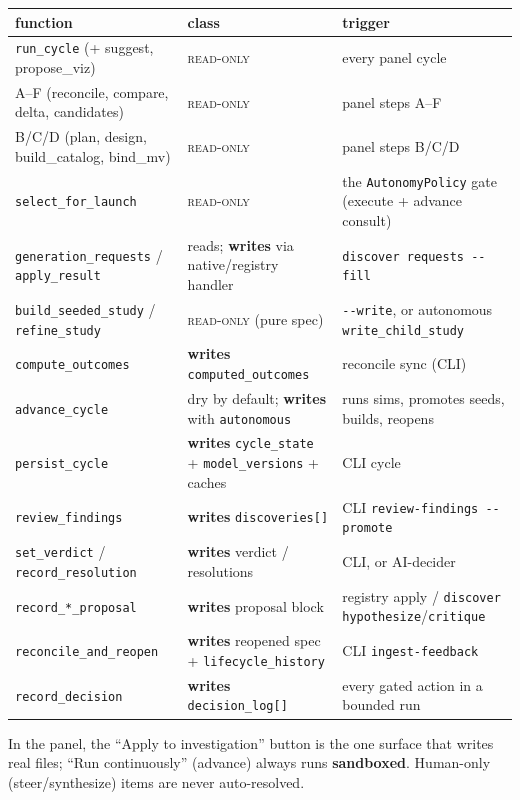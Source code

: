 \documentclass[11pt]{article}
\newcommand{\code}[1]{\texttt{\small #1}}
\begin{document}
\begin{center}\small
\begin{tabularx}{\textwidth}{@{}llY@{}}
\toprule
\textbf{function} & \textbf{class} & \textbf{trigger}\\
\midrule
\code{run\_cycle} (+ suggest, propose\_viz) & \textsc{read-only} & every panel cycle\\
A--F (reconcile, compare, delta, candidates) & \textsc{read-only} & panel steps A--F\\
B/C/D (plan, design, build\_catalog, bind\_mv) & \textsc{read-only} & panel steps B/C/D\\
\code{select\_for\_launch} & \textsc{read-only} & the \code{AutonomyPolicy} gate (execute + advance consult)\\
\code{generation\_requests} / \code{apply\_result} & reads; \textbf{writes} via native/registry handler & \code{discover requests -{}-fill}\\
\code{build\_seeded\_study} / \code{refine\_study} & \textsc{read-only} (pure spec) & \code{-{}-write}, or autonomous \code{write\_child\_study}\\
\code{compute\_outcomes} & \textbf{writes} \code{computed\_outcomes} & reconcile sync (CLI)\\
\code{advance\_cycle} & dry by default; \textbf{writes} with \code{autonomous} & runs sims, promotes seeds, builds, reopens\\
\code{persist\_cycle} & \textbf{writes} \code{cycle\_state} + \code{model\_versions} + caches & CLI cycle\\
\code{review\_findings} & \textbf{writes} \code{discoveries[]} & CLI \code{review-findings -{}-promote}\\
\code{set\_verdict} / \code{record\_resolution} & \textbf{writes} verdict / resolutions & CLI, or AI-decider\\
\code{record\_*\_proposal} & \textbf{writes} proposal block & registry apply / \code{discover hypothesize}/\code{critique}\\
\code{reconcile\_and\_reopen} & \textbf{writes} reopened spec + \code{lifecycle\_history} & CLI \code{ingest-feedback}\\
\code{record\_decision} & \textbf{writes} \code{decision\_log[]} & every gated action in a bounded run\\
\bottomrule
\end{tabularx}
\end{center}
In the panel, the ``Apply to investigation'' button is the one surface that writes real files;
``Run continuously'' (advance) always runs \textbf{sandboxed}. Human-only (steer/synthesize) items
are never auto-resolved.
\end{document}
